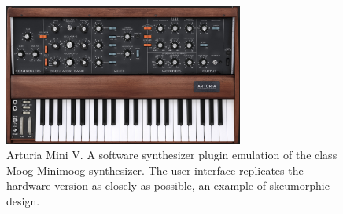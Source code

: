 \begin{figure}[ht]
    \centering
    \includegraphics[width=0.7\textwidth]{figures/background/minimoog_arturia.jpg}
    \caption{Arturia Mini V. A software synthesizer plugin emulation of the class Moog Minimoog synthesizer. The user interface replicates the hardware version as closely as possible, an example of skeumorphic design.}
    \label{fig:minimoog_arturia}
\end{figure}




